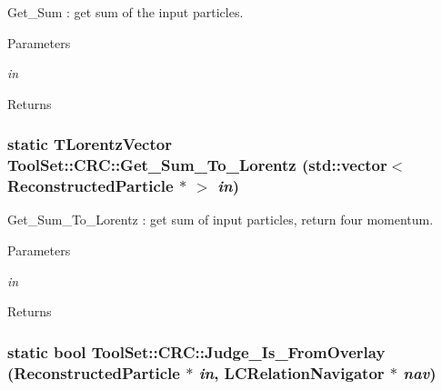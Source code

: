 Get\_\-Sum : get sum of the input particles. 
\begin{DoxyParams}{Parameters}
\item[{\em in}]\end{DoxyParams}
\begin{DoxyReturn}{Returns}

\end{DoxyReturn}
\hypertarget{classToolSet_1_1CRC_a590ec4e3b539f84e18eaaf9053236097}{
\subsubsection[{Get\_\-Sum\_\-To\_\-Lorentz}]{\setlength{\rightskip}{0pt plus 5cm}static TLorentzVector ToolSet::CRC::Get\_\-Sum\_\-To\_\-Lorentz (std::vector$<$ ReconstructedParticle $\ast$ $>$ {\em in})}}
\label{classToolSet_1_1CRC_a590ec4e3b539f84e18eaaf9053236097}


Get\_\-Sum\_\-To\_\-Lorentz : get sum of input particles, return four momentum. 
\begin{DoxyParams}{Parameters}
\item[{\em in}]\end{DoxyParams}
\begin{DoxyReturn}{Returns}

\end{DoxyReturn}
\hypertarget{classToolSet_1_1CRC_a3f2e8fcac0ebafa986567bd8c14f5656}{
\subsubsection[{Judge\_\-Is\_\-FromOverlay}]{\setlength{\rightskip}{0pt plus 5cm}static bool ToolSet::CRC::Judge\_\-Is\_\-FromOverlay (ReconstructedParticle $\ast$ {\em in}, \/  LCRelationNavigator $\ast$ {\em nav})}}
\label{classToolSet_1_1CRC_a3f2e8fcac0ebafa986567bd8c14f5656}


